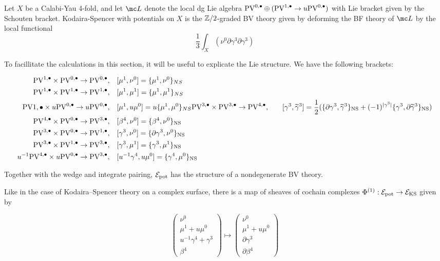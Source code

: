 \documentclass[11pt]{amsart}
\def\PV{{\rm PV}}
\begin{document}
\begin{dfn}
  Let $X$ be a Calabi-Yau 4-fold, and let $\mc L$ denote the local dg Lie algebra $\PV^{0,\bu}\oplus (\PV^{1,\bu}\to u\PV^{0,\bu})$ with Lie bracket given by the Schouten bracket. Kodaira-Spencer with potentials on $X$ is the $\mathbb Z/2$-graded BV theory given by deforming the BF theory of $\mc L$ by the local functional \[ \frac{1}{3}\int_{X}(\nu^{0}\partial\gamma^{3}\partial\gamma^{3})\]\end{dfn}

To facillitate the calculations in this section, it will be useful to explicate the Lie structure. We have the following brackets:

\begin{align}
  \PV^{1,\bu}\times\PV^{0,\bu}\to \PV^{0,\bu},\ \ \ & [\mu^{1},\nu^{0}] = \{\mu^{1},\nu^{0}\}_{NS}\\
  \PV^{1,\bu}\times\PV^{1,\bu}\to\PV^{1,\bu},\ \ \ & [\mu^{1}, \mu^{1}] = \{\mu^{1}, \mu^{1}\}_{NS}\\
  \PV{1,\bu}\times u\PV^{0,\bu}\to u\PV^{0,\bu}, \ \ \ & [\mu^{1}, u\mu^{0}]=u\{\mu^{1},\mu^{0}\}_{NS}
  \PV^{3,\bu}\times \PV^{3,\bu}\to \PV^{4,\bu}, \ \ \ & [\gamma^3, \Tilde{\gamma}^3] = \frac{1}{2}(\{\partial \gamma^3 , \Tilde{\gamma}^{3}\}_{\rm NS} +(-1)^{|\gamma^{3}|} \{\gamma^3, \partial \Tilde{\gamma}^{3}\}_{\rm NS}) \\
  \PV^{4,\bu}\times \PV^{0,\bu}\to \PV^{3,\bu}, \ \ \ & [\beta^{4}, \nu^{0}] = \{\beta^{4}, \nu^{0}\}_{\rm {NS}}\\
  \PV^{3,\bu}\times \PV^{0,\bu}\to \PV^{1,\bu}, \ \ \ & [\gamma^{3}, \nu^{0}] = \{\partial\gamma^{3}, \nu^{0}\}_{\rm NS}\\
  \PV^{3,\bu}\times \PV^{1,\bu}\to \PV^{3,\bu}, \ \ \ & [\gamma^{3}, \mu^{1}] = \{\gamma^{3}, \mu^{1}\}_{\rm NS}\\
  u^{-1}\PV^{4,\bu}\times u\PV^{0,\bu}\to \PV^{3,\bu}, \ \ \ & [u^{-1}\gamma^{4}, u\mu^{0}] = \{\gamma^{4},\mu^{0}\}_{\rm NS}
\end{align}

Together with the wedge and integrate pairing, $\mathcal E_{\rm pot}$ has the structure of a nondegenerate BV theory.

Like in the case of Kodaira--Spencer theory on a complex surface, there is a  map of sheaves of cochain complexes $\Phi^{(1)}: \mathcal E_{\rm pot}\to \mathcal E_{\rm KS}$ given by

\[\begin{pmatrix}\nu^{0} \\ \mu^{1}+u\mu^{0} \\ u^{-1}\gamma^{4}+\gamma^{3} \\ \beta^{4}\end{pmatrix}\mapsto \begin{pmatrix}\nu^{0} \\ \mu^{1}+u\mu^{0} \\ \partial\gamma^{3} \\ \partial\beta^{4}\end{pmatrix}\]
\end{document}
